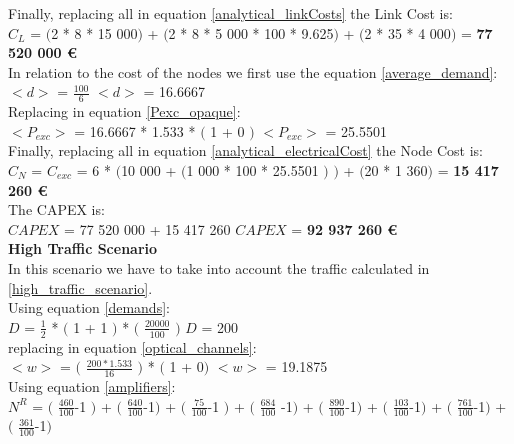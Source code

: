 Finally, replacing all in equation \ref{analytical_linkCosts} the Link Cost is:\\

$C_L$ = $($2 * 8 * 15 000$)$ + $($2 * 8 * 5 000 * 100 * 9.625$)$ + $($2 * 35 * 4 000$)$ = \textbf{77 520 000 \euro}\\

In relation to the cost of the nodes we first use the equation \ref{average_demand}:\\

$<d>$ = $\frac{100}{6}$ \qquad \qquad $<d>$ = 16.6667\\

Replacing in equation \ref{Pexc_opaque}:\\

$<P_{exc}>$ = 16.6667 * 1.533 * $($ 1 + 0 $)$ \qquad \qquad $<P_{exc}>$ = 25.5501 \\

Finally, replacing all in equation \ref{analytical_electricalCost} the Node Cost is:\\

$C_N$ = $C_{exc}$ = 6 * $($10 000 + $($1 000 * 100 * 25.5501 $)$ $)$ + $($20 * 1 360$)$ = \textbf{15 417 260 \euro}\\

The CAPEX is:\\

$CAPEX$ = 77 520 000 + 15 417 260 \qquad \qquad $CAPEX$ = \textbf{92 937 260 \euro}\\

\textbf{High Traffic Scenario}\\

In this scenario we have to take into account the traffic calculated in \ref{high_traffic_scenario}.\\

Using equation \ref{demands}:\\

$D$ = $\frac{1}{2}$ * $($ 1 + 1 $)$ * $($ $\frac{20 000}{100}$ $)$ \qquad \qquad $D$ = 200\\

replacing in equation \ref{optical_channels}:\\

$<w>$ = $($ $\frac{200 * 1.533}{16}$ $)$ * $($ 1 + 0$)$ \qquad \quad $<w>$ = 19.1875\\

Using equation \ref{amplifiers}:\\

$N^R$ = $($ $\frac{460}{100}$-1 $)$ + $($ $\frac{640}{100}$-1$)$ + $($ $\frac{75}{100}$-1 $)$ + $($ $\frac{684}{100}$ -1$)$ + $($ $\frac{890}{100}$-1$)$ + $($ $\frac{103}{100}$-1$)$ + $($ $\frac{761}{100}$-1$)$ + $($ $\frac{361}{100}$-1$)$\\


